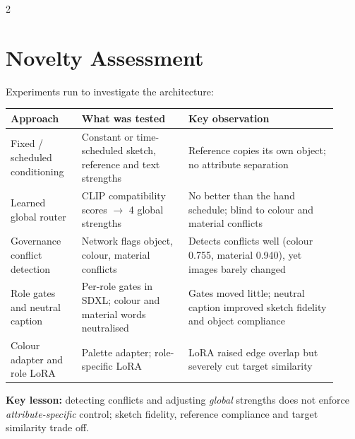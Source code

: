 \documentclass[a1,portrait]{a0poster}
\begin{document}
\begin{minipage}[c]{\linewidth}
\begin{framed}
\begin{multicols}{2}
\section*{Novelty Assessment}
Experiments run to investigate the architecture:
\begin{center}
\small
\renewcommand{\arraystretch}{1.25}
\begin{tabular}{|p{0.2\linewidth}|p{0.3\linewidth}|p{0.42\linewidth}|}
\hline
\textbf{Approach} & \textbf{What was tested} & \textbf{Key observation}\\
\hline
Fixed / scheduled conditioning & Constant or time-scheduled sketch, reference and text strengths & Reference copies its own object; no attribute separation\\
\hline
Learned global router & CLIP compatibility scores $\rightarrow$ 4 global strengths & No better than the hand schedule; blind to colour and material conflicts\\
\hline
Governance conflict detection & Network flags object, colour, material conflicts & Detects conflicts well (colour 0.755, material 0.940), yet images barely changed\\
\hline
Role gates and neutral caption & Per-role gates in SDXL; colour and material words neutralised & Gates moved little; neutral caption improved sketch fidelity and object compliance\\
\hline
Colour adapter and role LoRA & Palette adapter; role-specific LoRA & LoRA raised edge overlap but severely cut target similarity\\
\hline
\end{tabular}
\end{center}
\textbf{Key lesson:} detecting conflicts and adjusting \emph{global} strengths does not enforce \emph{attribute-specific} control; sketch fidelity, reference compliance and target similarity trade off.

\color{Black}

\end{multicols}
\end{framed}
\end{minipage}
\end{document}
